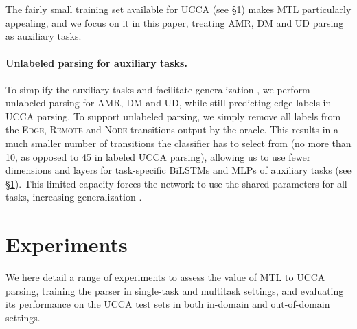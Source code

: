 \documentclass[11pt,a4paper]{article}
\begin{document}
The fairly small training set available for UCCA (see \S\ref{sec:experiments})
makes MTL particularly appealing,
and we focus on it in this paper, treating AMR, DM and UD parsing as auxiliary tasks.

\paragraph{Unlabeled parsing for auxiliary tasks.}
To simplify the auxiliary tasks and facilitate generalization \cite{E17-2026},
we perform unlabeled parsing for AMR, DM and UD,
while still predicting edge labels in UCCA parsing.
To support unlabeled parsing, we simply remove all labels from the
\textsc{Edge}, \textsc{Remote} and \textsc{Node} transitions output by the oracle.
This results in a much smaller number of transitions the classifier has to select from
(no more than 10, as opposed to 45 in labeled UCCA parsing),
allowing us to use fewer dimensions and layers for task-specific BiLSTMs and MLPs
of auxiliary tasks (see \S\ref{sec:experiments}).
This limited capacity forces the network to use the shared parameters for all tasks,
increasing generalization \cite{E17-1005}.



\section{Experiments}\label{sec:experiments}

We here detail a range of experiments to assess the value of MTL to UCCA parsing,
training the parser in single-task and multitask settings,
and evaluating its performance on the UCCA test sets in both in-domain and out-of-domain settings.
\end{document}

